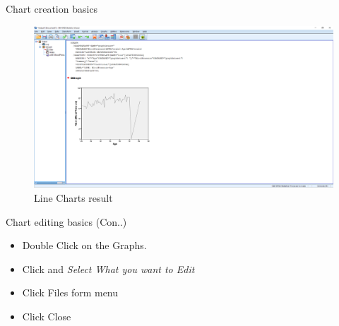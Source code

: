 \begin{frame}[t]{Chart creation basics}
	\begin{figure}
		\centering
		\includegraphics[width=12cm]{img/charts_5}
		\caption{Line Charts result}
	\end{figure}
\end{frame}

\begin{frame}[t]{Chart editing basics (Con..)}
	\begin{itemize}
		\item Double Click on the Graphs.
		\item Click and \textit{Select What you want to Edit}
		\item Click Files form menu
		\item Click Close
		
	\end{itemize}
\end{frame}

